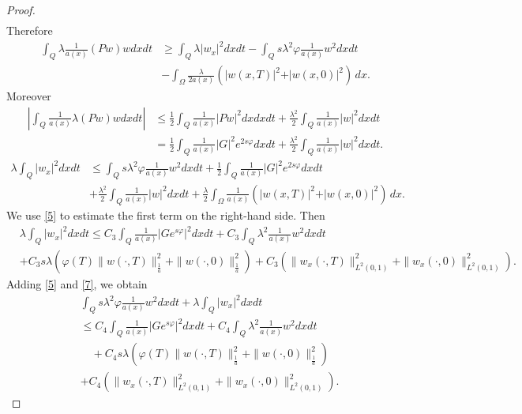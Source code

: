 \documentclass[reqno]{amsart}
\theoremstyle{plain}
\theoremstyle{remark}
\numberwithin{equation}{section}
\begin{document}
\begin{proof}
\begin{align*}
\end{align*}
Therefore
\begin{align*}
    \int_{Q}\lambda \frac{1}{a(x)}\left(Pw \right)w dxdt &\geqslant   \int_{Q}\lambda \vert w_{x}\vert^2 dx dt- \int_{Q} s\lambda^2 \varphi \frac{1}{a(x)} w^2 dxdt\\& - \int_{\Omega}\frac{\lambda}{2a(x)}\left(\vert w(x,T)\vert^2+\vert w(x,0)\vert^2 \right)\, dx.
\end{align*}
Moreover
\begin{align*}
\left\vert \int_{Q} \frac{1}{a(x)} \lambda(Pw)wdxdt\right\vert  & \leqslant \frac{1}{2}\int_{Q}\frac{1}{a(x)}\vert Pw\vert^2 dx dx dt+\frac{\lambda^2}{2}\int_{Q}\frac{1}{a(x)}\vert w\vert^2 dx dt\\ & =\frac{1}{2} \int_{Q} \frac{1}{a(x)}\vert G \vert^2 e^{2s\varphi} dxdt +\frac{\lambda^2}{2}\int_{Q}\frac{1}{a(x)}\vert w\vert^2 dx dt.
\end{align*}
\begin{align*}
    \lambda \int_{Q} \vert w_{x}\vert^2  dx dt &\leqslant \int_{Q}s\lambda^2\varphi \frac{1}{a(x)}w^2 dxdt + \frac{1}{2} \int_{Q} \frac{1}{a(x)}\vert G \vert^2 e^{2s\varphi} dxdt \\&+\frac{\lambda^2}{2}\int_{Q}\frac{1}{a(x)}\vert w\vert^2 dx dt  + \frac{\lambda}{2}\int_{\Omega}\frac{1}{a(x)}\left(\vert w(x,T)\vert^2+\vert w(x,0)\vert^2 \right)\, dx.
\end{align*}
We use \eqref{5} to estimate the first term on the right-hand side. Then
\begin{equation}\label{7}
\begin{aligned}
 & \lambda \int_{Q} \vert w_{x}\vert^2  dx dt  \leqslant C_{3}\int_{Q}\frac{1}{a(x)}\vert Ge^{s\varphi}\vert^2 dxdt + C_{3}\int_{Q}\lambda^2 \frac{1}{a(x)} w^2 dxdt  \\ &+C_{3}s\lambda \left(\varphi(T)\| w(\cdot,T)\|_{\frac{1}{a}}^2+\| w(\cdot,0)\|_{\frac{1}{a}}^2 \right)+C_{3}\left( \| w_{x}(\cdot,T)\|_{L^2(0,1)}^2+\| w_{x}(\cdot,0)\|_{L^2(0,1)}^2\right).
\end{aligned}
\end{equation}
Adding \eqref{5} and \eqref{7}, we obtain
\begin{align*}
    &\int_{Q} s\lambda^2 \varphi \frac{1}{a(x)} w^2 dxdt+\lambda \int_{Q} \vert w_{x}\vert^2  dx dt \\& \leqslant C_{4}  \int_{Q} \frac{1}{a(x)}\vert Ge^{s\varphi}\vert^2 dxdt +C_{4}\int_{Q}\lambda^2  \frac{1}{a(x)} w^2 dxdt\\
    &\quad +C_{4}s\lambda \left(\varphi(T)\| w(\cdot,T)\|_{\frac{1}{a}}^2+\| w(\cdot,0)\|_{\frac{1}{a}}^2 \right) \\&+C_{4}\left( \| w_{x}(\cdot,T)\|_{L^2(0,1)}^2+\| w_{x}(\cdot,0)\|_{L^2(0,1)}^2\right).

\end{align*}
\end{proof}
\end{document}
